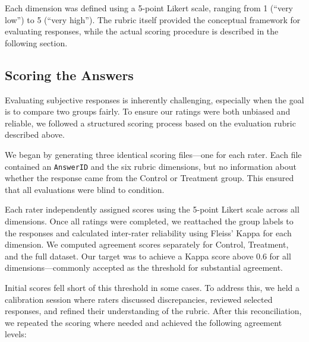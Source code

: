 Each dimension was defined using a 5-point Likert scale, ranging from 1 (``very low'') to 5 (``very high''). The rubric itself provided the conceptual framework for evaluating responses, while the actual scoring procedure is described in the following section.

\subsection{Scoring the Answers}
Evaluating subjective responses is inherently challenging, especially when the goal is to compare two groups fairly. To ensure our ratings were both unbiased and reliable, we followed a structured scoring process based on the evaluation rubric described above.

We began by generating three identical scoring files---one for each rater. Each file contained an \texttt{AnswerID} and the six rubric dimensions, but no information about whether the response came from the Control or Treatment group. This ensured that all evaluations were blind to condition.

Each rater independently assigned scores using the 5-point Likert scale across all dimensions. Once all ratings were completed, we reattached the group labels to the responses and calculated inter-rater reliability using Fleiss' Kappa for each dimension. We computed agreement scores separately for Control, Treatment, and the full dataset. Our target was to achieve a Kappa score above 0.6 for all dimensions---commonly accepted as the threshold for substantial agreement.

Initial scores fell short of this threshold in some cases. To address this, we held a calibration session where raters discussed discrepancies, reviewed selected responses, and refined their understanding of the rubric. After this reconciliation, we repeated the scoring where needed and achieved the following agreement levels:

\begin{table}[H]
  \centering
  \caption{Fleiss' Kappa Scores by Dimension and Group}
  \label{tab:kappa}
\end{table}


